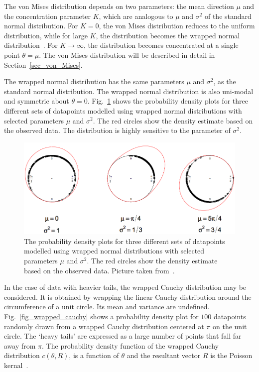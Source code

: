 \documentclass[10pt,journal,cspaper,compsoc]{IEEEtran}
\begin{document}
The von Mises distribution depends on two parameters: the mean direction $\mu$ and the concentration parameter $K$, which are analogous to $\mu$ and $\sigma^{2}$ of the standard normal distribution. For $K=0$, the von Mises distribution reduces to the uniform distribution, while for large $K$, the distribution becomes the wrapped normal distribution~\cite{collett1981discriminating, downs1967some}. For $K \rightarrow \infty$, the distribution becomes concentrated at a single point $\theta=\mu$. The von Mises distribution will be described in detail in Section~\ref{sec_von_Mises}.

The wrapped normal distribution has the same parameters $\mu$ and $\sigma^{2}$, as the standard normal distribution. The wrapped normal distribution is also uni-modal and symmetric about $\theta=0$. Fig.~\ref{fig_wrapped_normal} shows the probability density plots for three different sets of datapoints modelled using wrapped normal distributions with selected parameters $\mu$ and $\sigma^{2}$. The red circles show the density estimate based on the observed data. The distribution is highly sensitive to the parameter of $\sigma^{2}$.

\begin{figure}[t!]
      \centering
      \includegraphics[scale=0.45]{figures/Ch6/wrapped_normal.png}
      \caption{The probability density plots for three different sets of datapoints modelled using wrapped normal distributions with selected parameters $\mu$ and $\sigma^{2}$. The red circles show the density estimate based on the observed data. Picture taken from~\cite{gill2010circular}.}
      \label{fig_wrapped_normal}
\end{figure}

In the case of data with heavier tails, the wrapped Cauchy distribution may be considered. It is obtained by wrapping the linear Cauchy distribution around the circumference of a unit circle. Its mean and variance are undefined. Fig.~\ref{fig_wrapped_cauchy} shows a probability density plot for $100$ datapoints randomly drawn from a wrapped Cauchy distribution centered at $\pi$ on the unit circle. The `heavy tails' are expressed as a large number of points that fall far away from $\pi$. The probability density function of the wrapped Cauchy distribution $c(\theta, R)$, is a function of $\theta$ and the resultant vector $R$ is the Poisson kernal~\cite{mardia1972statistics}.
\end{document}
